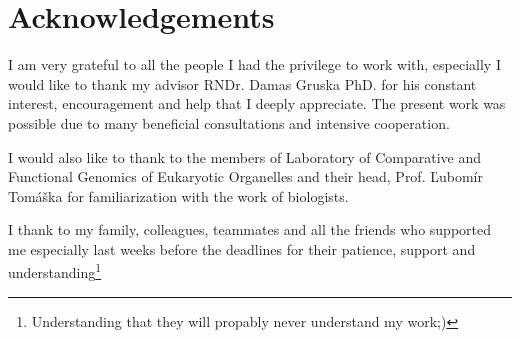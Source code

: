 \chapter*{Acknowledgements}

I am very grateful to all the people I had the privilege to work with, especially I would like to thank my advisor RNDr. Damas Gruska PhD. for his constant interest, encouragement and help that I deeply appreciate.
The present work was possible due to many beneficial consultations and intensive cooperation.

I would also like to thank to the members of Laboratory of Comparative and Functional Genomics of Eukaryotic Organelles and their head, Prof. Ľubomír Tomáška for familiarization with the work of biologists.

I thank to my family, colleagues, teammates and all the friends who supported me especially last weeks before the deadlines for their patience, support and understanding\footnote{Understanding that they will propably never understand my work;)}

